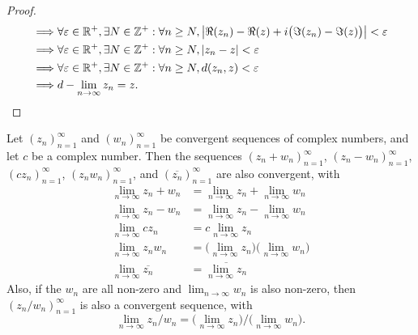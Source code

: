 \begin{proof}
\begin{align*}
    \implies & \forall \varepsilon \in \mathbb{R}^+, \exists N \in \mathbb{Z}^+ : \forall n \geq N, \left\lvert\Re(z_n) - \Re(z) + i \big(\Im(z_n) - \Im(z)\big)\right\rvert < \varepsilon                                              \\
    \implies & \forall \varepsilon \in \mathbb{R}^+, \exists N \in \mathbb{Z}^+ : \forall n \geq N, \left\lvert z_n - z\right\rvert < \varepsilon                                                                                        \\
    \implies & \forall \varepsilon \in \mathbb{R}^+, \exists N \in \mathbb{Z}^+ : \forall n \geq N, d(z_n, z) < \varepsilon                                                                                            \\
    \implies & d - \lim_{n \to \infty} z_n = z.
  \end{align*}
\end{proof}

\begin{lem}\label{ii:4.6.14}
  Let \((z_n)_{n = 1}^\infty\) and \((w_n)_{n = 1}^\infty\) be convergent sequences of complex numbers, and let \(c\) be a complex number.
  Then the sequences \((z_n + w_n)_{n = 1}^\infty\), \((z_n - w_n)_{n = 1}^\infty\), \((c z_n)_{n = 1}^\infty\), \((z_n w_n)_{n = 1}^\infty\), and \((\overline{z_n})_{n = 1}^\infty\) are also convergent, with
  \begin{align*}
    \lim_{n \to \infty} z_n + w_n      & = \lim_{n \to \infty} z_n + \lim_{n \to \infty} w_n                       \\
    \lim_{n \to \infty} z_n - w_n      & = \lim_{n \to \infty} z_n - \lim_{n \to \infty} w_n                       \\
    \lim_{n \to \infty} c z_n          & = c \lim_{n \to \infty} z_n                                               \\
    \lim_{n \to \infty} z_n w_n        & = \bigg(\lim_{n \to \infty} z_n\bigg) \bigg(\lim_{n \to \infty} w_n\bigg) \\
    \lim_{n \to \infty} \overline{z_n} & = \overline{\lim_{n \to \infty} z_n}
  \end{align*}
  Also, if the \(w_n\) are all non-zero and \(\lim_{n \to \infty} w_n\) is also non-zero, then \((z_n / w_n)_{n = 1}^\infty\) is also a convergent sequence, with
  \[
    \lim_{n \to \infty} z_n / w_n = \bigg(\lim_{n \to \infty} z_n\bigg) / \bigg(\lim_{n \to \infty} w_n\bigg).
  \]
\end{lem}

